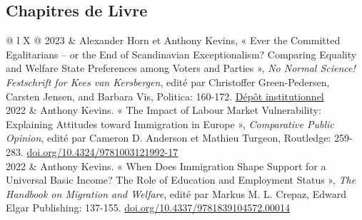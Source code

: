 \documentclass[letterpaper,fontsize=10.5pt]{scrartcl}
\begin{document}
\subsection{Chapitres de Livre}
\vspace{-2em}
\begin{longtblr}[entry=none,label=none]{@{} l X @{}}
	2023 & Alexander Horn et Anthony Kevins, « Ever the Committed Egalitarians – or the End of Scandinavian Exceptionalism? Comparing Equality and Welfare State Preferences among Voters and Parties », \textit{No Normal Science! Festschrift for Kees van Kersbergen}, edité par Christoffer Green-Pedersen, Carsten Jensen, and Barbara Vis, Politica: 160-172. \href{https://repository.lboro.ac.uk/articles/chapter/Ever_the_committed_egalitarians_or_the_end_of_Scandinavian_exceptionalism_Comparing_equality_and_welfare_state_preferences_among_voters_and_parties/24220813}{Dépôt institutionnel}\\
	2022 & Anthony Kevins. « The Impact of Labour Market Vulnerability: Explaining Attitudes toward Immigration in Europe », \textit{Comparative Public Opinion}, edité par Cameron D. Anderson et Mathieu Turgeon, Routledge: 259-283. \href{https://doi.org/10.4324/9781003121992-17}{doi.org/10.4324/9781003121992-17}                             \\
	2022 & Anthony Kevins. « When Does Immigration Shape Support for a Universal Basic Income? The Role of Education and Employment Status », \textit{The Handbook on Migration and Welfare}, edité par Markus M. L. Crepaz, Edward Elgar Publishing: 137-155. \href{https://doi.org/10.4337/9781839104572.00014}{doi.org/10.4337/9781839104572.00014} 
\end{longtblr}

\end{document}
